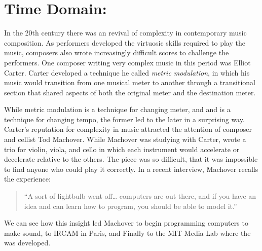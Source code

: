 \chapter{Time Domain: \polytempic}
\label{ch:polytempic}
In the 20th century there was an revival of complexity in contemporary
music composition. As performers developed the
virtuosic skills required to play the music, composers also wrote
increasingly difficult scores to challenge the
performers.\cite{grout2006} One composer writing very complex music in
this period was Elliot Carter. Carter developed a technique he called
\textit{metric modulation}, in which his music would transition from
one musical meter to another through a transitional section that
shared aspects of both the original meter and the destination
meter.

While metric modulation is a technique for changing meter, and
and \polytempic is a technique for changing tempo, the former led to
the later in a surprising way. Carter's reputation for complexity in
music attracted the attention of composer and cellist Tod
Machover. While Machover was studying with Carter, wrote a trio for
violin, viola, and cello in which each instrument would accelerate or
decelerate relative to the others. The piece was so difficult, that
it was impossible to find anyone who could play it correctly. In a
recent interview, Machover recalls the experience:
\begin{quotation}``A sort of lightbulb went off\ldots{} computers are out
  there, and if you have an idea and can learn how to program, you
  should be able to model it.''\cite{Fein2014}
\end{quotation}
We can see how this insight led Machover to begin programming
computers to make sound, to IRCAM in Paris, and Finally to the MIT
Media Lab where the \polytempic was developed. 

